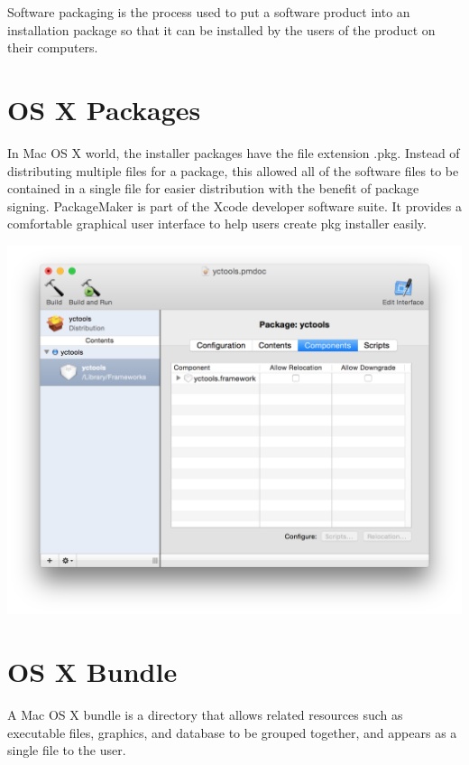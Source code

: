 Software packaging is the process used to put a software product into an installation package so that it can be installed by the users of the product on their computers. \hypertarget{_software_packaging_SoftwarePackagingOSXPackages}{}\section{O\+S X Packages}\label{_software_packaging_SoftwarePackagingOSXPackages}
In Mac O\+S X world, the installer packages have the file extension .pkg. Instead of distributing multiple files for a package, this allowed all of the software files to be contained in a single file for easier distribution with the benefit of package signing. Package\+Maker is part of the Xcode developer software suite. It provides a comfortable graphical user interface to help users create pkg installer easily. \cite{PackageMaker} 
\begin{DoxyImageNoCaption}
  \mbox{\includegraphics[width=\textwidth,height=\textheight/2,keepaspectratio=true]{ResearchPackegeMaker.png}}
\end{DoxyImageNoCaption}
\hypertarget{_software_packaging_SoftwarePackagingOSXBundle}{}\section{O\+S X Bundle}\label{_software_packaging_SoftwarePackagingOSXBundle}
A Mac O\+S X bundle is a directory that allows related resources such as executable files, graphics, and database to be grouped together, and appears as a single file to the user.
